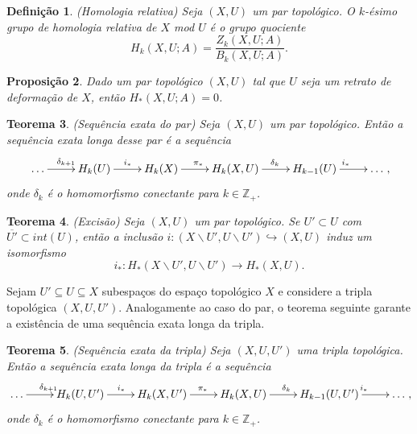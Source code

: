 \documentclass[12pt]{book}
\newtheorem{teorema}{Teorema}[section]
\newtheorem{definicao}[teorema]{Definição}
\newtheorem{proposicao}[teorema]{Proposição}
\newcommand{\complementar}[2]{#1 \backslash #2}
\newcommand{\homologia}[2]{H_{#1}(#2;A)}
\newcommand{\homologiaabrev}[2]{H_{#1}(#2)}
\newcommand{\imagembordo}[2]{B_{#1}(#2;A)}
\newcommand{\inteiros}{\mathbb{Z}}
\newcommand{\inteirospos}{\inteiros_{+}}
\newcommand{\kernelbordo}[2]{Z_{#1}(#2;A)}
\begin{document}
	\begin{definicao}
		(Homologia relativa) Seja $(X, U)$ um par topológico. O $k$-ésimo grupo de homologia relativa de $X$ mod $U$ é o grupo quociente
		$$
		\homologia{k}{X,U} = \frac{\kernelbordo{k}{X,U}}{\imagembordo{k}{X, U}}.
		$$
	\end{definicao}
	
	\begin{proposicao}
		Dado um par topológico $(X, U)$ tal que $U$ seja um retrato de deformação de $X$, então $\homologia{*}{X,U} = 0$.
	\end{proposicao}
	
	\begin{teorema}
		(Sequência exata do par) Seja $(X, U)$ um par topológico. Então a sequência exata longa desse par é a sequência
		$$
		\xymatrix{\dots \ar[r]^{\delta_{k+1}} & \homologiaabrev{k}{U}\ar[r]^{i_{*}} & \homologiaabrev{k}{X}\ar[r]^{\pi_{*}}& \homologiaabrev{k}{X, U}\ar[r]^{\delta_{k}} & \homologiaabrev{k-1}{U} \ar[r]^{i_{*}}& \dots},
		$$
		onde $\delta_{k}$ é o homomorfismo conectante para $k \in \inteirospos$.
	\end{teorema}
	
	\begin{teorema}
		(Excisão) Seja $(X, U)$ um par topológico. Se $U' \subset U$ com $\overline{U'} \subset int(U)$, então a inclusão $i : (\complementar{X}{U'}, \complementar{U}{U'}) \hookrightarrow (X, U)$ induz um isomorfismo 
		$$
		i_{*}: \homologiaabrev{*}{\complementar{X}{U'}, \complementar{U}{U'}} \to \homologiaabrev{*}{X, U}.
		$$
	\end{teorema}
	
	
	Sejam $U'\subseteq U \subseteq X$ subespaços do espaço topológico $X$ e considere a tripla topológica $(X, U, U')$. Analogamente ao caso do par, o teorema seguinte garante a existência de uma sequência exata longa da tripla.
	
	\begin{teorema}
		(Sequência exata da tripla) Seja $(X, U, U')$ uma tripla topológica. Então a sequência exata longa da tripla é a sequência
		$$
		\xymatrix{\dots \ar[r]^{\delta_{k+1}} & \homologiaabrev{k}{U, U'}\ar[r]^{i_{*}} & \homologiaabrev{k}{X, U'}\ar[r]^{\pi_{*}}& \homologiaabrev{k}{X, U}\ar[r]^{\delta_{k}} & \homologiaabrev{k-1}{U, U'} \ar[r]^{i_{*}}& \dots},
		$$
		onde $\delta_{k}$ é o homomorfismo conectante para $k \in \inteirospos$.
	\end{teorema}
	
	
	
\end{document}
